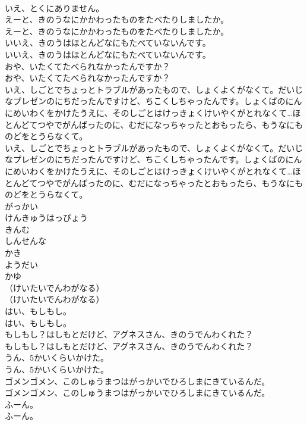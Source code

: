 \documentclass[8pt]{extreport}
\begin{document}
\begin{CJK}{UTF8}{min}
\\	いえ、とくにありません。 
\\	えーと、きのうなにかかわったものをたべたりしましたか。	
\\	えーと、きのうなにかかわったものをたべたりしましたか。 
\\	いいえ、きのうはほとんどなにもたべていないんです。	
\\	いいえ、きのうはほとんどなにもたべていないんです。 
\\	おや、いたくてたべられなかったんですか？	
\\	おや、いたくてたべられなかったんですか？ 
\\	いえ、しごとでちょっとトラブルがあったもので、しょくよくがなくて。だいじなプレゼンのにちだったんですけど、ちこくしちゃったんです。しょくばのにんにめいわくをかけたうえに、そのしごとはけっきょくけいやくがとれなくて…ほとんどてつやでがんばったのに、むだになっちゃったとおもったら、もうなにものどをとうらなくて。	
\\	いえ、しごとでちょっとトラブルがあったもので、しょくよくがなくて。だいじなプレゼンのにちだったんですけど、ちこくしちゃったんです。しょくばのにんにめいわくをかけたうえに、そのしごとはけっきょくけいやくがとれなくて…ほとんどてつやでがんばったのに、むだになっちゃったとおもったら、もうなにものどをとうらなくて。 
\\	がっかい
\\	けんきゅうはっぴょう
\\	きんむ
\\	しんせんな
\\	かき
\\	ようだい
\\	かゆ
\\	（けいたいでんわがなる）	
\\	（けいたいでんわがなる） 
\\	はい、もしもし。	
\\	はい、もしもし。 
\\	もしもし？はしもとだけど、アグネスさん、きのうでんわくれた？	
\\	もしもし？はしもとだけど、アグネスさん、きのうでんわくれた？ 
\\	うん、5かいくらいかけた。	
\\	うん、5かいくらいかけた。 
\\	ゴメンゴメン、このしゅうまつはがっかいでひろしまにきているんだ。	
\\	ゴメンゴメン、このしゅうまつはがっかいでひろしまにきているんだ。 
\\	ふーん。	
\\	ふーん。 

\end{CJK}
\end{document}

